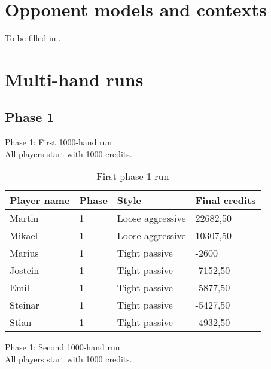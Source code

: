 \documentclass[a4paper, 12pt]{article}
\begin{document}
\section{Opponent models and contexts}
To be filled in..

\section{Multi-hand runs}

\subsection{Phase 1}
\begin{center}
	{ \Large Phase 1: First 1000-hand run } \\
	All players start with 1000 credits.
\end{center}

\begin{table}[H]
	\begin{center}
		\begin{tabular}{|l|l|l| p{6cm} |}
		\hline
		\textbf{Player name} & \textbf{Phase} & \textbf{Style} & \textbf{Final credits} \\
		\hline
		Martin & 1 & Loose aggressive & 22682,50 \\
		\hline
		Mikael & 1 & Loose aggressive & 10307,50 \\
		\hline
		Marius & 1 & Tight passive & -2600 \\
		\hline
		Jostein & 1 & Tight passive & -7152,50 \\
		\hline
		Emil & 1 & Tight passive & -5877,50 \\
		\hline
		Steinar & 1 & Tight passive & -5427,50 \\
		\hline
		Stian & 1 & Tight passive & -4932,50 \\
		\hline
		\end{tabular}
	\end{center}
	\caption{First phase 1 run}
\end{table}

\begin{center}
	{ \Large Phase 1: Second 1000-hand run } \\
	All players start with 1000 credits.
\end{center}
\end{document}
